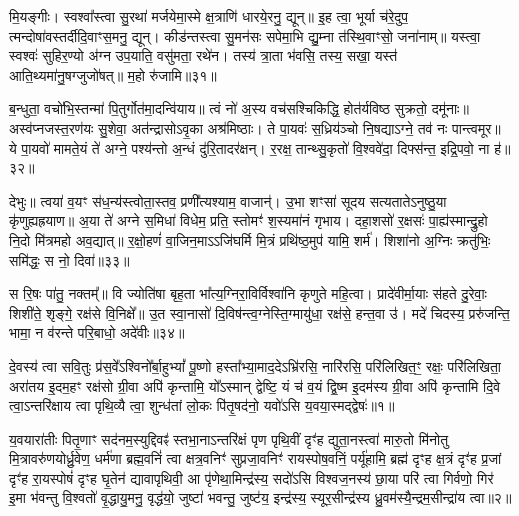 मि॒यङ्गीः। स्वश्वा᳚स्त्वा सु॒रथा॑ मर्जयेमा॒स्मे क्ष॒त्राणि॑ धारये॒रनु॒ द्यून्॥ इ॒ह त्वा॒ भूर्या च॑रे॒दुप॒ त्मन्दोषा॑वस्तर्दीदि॒वाꣳ\-स॒मनु॒ द्यून्। कीड॑न्तस्त्वा सु॒मन॑सः सपेमा॒भि द्यु॒म्ना त॑स्थि॒वाꣳसो॒ जना॑नाम्॥ यस्त्वा॒ स्वश्वः॑ सुहिर॒ण्यो अ॑ग्न उप॒याति॒ वसु॑मता॒ रथे॑न। तस्य॑ त्रा॒ता भ॑वसि॒ तस्य॒ सखा॒ यस्त॑ आति॒थ्यमा॑नु॒षग्जुजो॑षत्॥ म॒हो रु॑जामि॥३१॥

ब॒न्धुता॒ वचो॑भि॒स्तन्मा॑ पि॒तुर्गोत॑मा॒दन्वि॑याय॥ त्वं नो॑ अ॒स्य वच॑सश्चिकिद्धि॒ होत॑र्यविष्ठ सुक्रतो॒ दमू॑नाः॥ अस्व॑प्नजस्त॒रण॑यः सु॒शेवा॒ अत॑न्द्रासो\-ऽवृ॒का अश्र॑मिष्ठाः। ते पा॒यवः॑ स॒ध्रिय॑ञ्चो नि॒षद्या\-ऽग्ने॒ तव॑ नः पान्त्वमूर॥ ये पा॒यवो॑ मामते॒यं ते॑ अग्ने॒ पश्य॑न्तो अ॒न्धं दु॑रि॒तादर॑क्षन्। र॒रक्ष॒ तान्थ्सु॒कृतो॑ वि॒श्ववे॑दा॒ दिफ्स॑न्त॒ इद्रि॒पवो॒ ना ह॑॥३२॥

देभुः॥ त्वया॑ व॒यꣳ स॑ध॒न्य॑स्त्वोता॒स्तव॒ प्रणी᳚त्यश्याम॒ वाजान्॑। उ॒भा शꣳसा॑ सूदय सत्यताते\-ऽनुष्ठु॒या कृ॑णुह्यह्रयाण॥ अ॒या ते॑ अग्ने स॒मिधा॑ विधेम॒ प्रति॒ स्तोमꣳ॑ श॒स्यमा॑नं गृभाय। दहा॒शसो॑ र॒क्षसः॑ पा॒ह्य॑स्मान्द्रु॒हो नि॒दो मि॑त्रमहो अव॒द्यात्॥ र॒क्षो॒हणं॑ वा॒जिन॒मा\-ऽ\-ऽजि॑घर्मि मि॒त्रं प्रथि॑ष्ठ॒मुप॑ यामि॒ शर्म॑। शिशा॑नो अ॒ग्निः क्रतु॑भिः॒ समि॑द्धः॒ स नो॒ दिवा॑॥३३॥

स रि॒षः पा॑तु॒ नक्तम्᳚॥ वि ज्योति॑षा बृह॒ता भा᳚त्य॒ग्निरा॒विर्विश्वा॑नि कृणुते महि॒त्वा। प्रादे॑वीर्मा॒याः स॑हते दु॒रेवाः॒ शिशी॑ते॒ शृङ्गे॒ रक्ष॑से वि॒निक्षे᳚॥ उ॒त स्वा॒नासो॑ दि॒विष॑न्त्व॒ग्नेस्ति॒ग्मायु॑धा॒ रक्ष॑से॒ हन्त॒वा उ॑। मदे॑ चिदस्य॒ प्ररु॑जन्ति॒ भामा॒ न व॑रन्ते परि॒बाधो॒ अदे॑वीः॥३४॥

{}


\setcounter{anuvakam}{0}
दे॒वस्य॑ त्वा सवि॒तुः प्र॑स॒वे᳚\-ऽश्विनो᳚र्बा॒हु\-भ्यां᳚ पू॒ष्णो हस्ता᳚भ्या॒माद॒दे\-ऽभ्रि॑रसि॒ नारि॑रसि॒ परि॑लिखित॒ꣳ॒ रक्षः॒ परि॑लिखिता॒ अरा॑तय इ॒दम॒हꣳ रक्ष॑सो ग्री॒वा अपि॑ कृन्तामि॒ यो᳚\-ऽस्मान् द्वेष्टि॒ यं च॑ व॒यं द्वि॒ष्म इ॒दम॑स्य ग्री॒वा अपि॑ कृन्तामि दि॒वे त्वा॒\-ऽन्तरि॑क्षाय त्वा पृथि॒व्यै त्वा॒ शुन्ध॑तां लो॒कः पि॑तृ॒षद॑नो॒ यवो॑\-ऽसि य॒वया॒स्मद्द्वेषः॑॥१॥

य॒वयारा॑तीः पितृ॒णाꣳ सद॑नम॒स्युद्दिवꣴ॑ स्तभा॒ना\-ऽन्तरि॑क्षं पृण पृथि॒वीं दृꣳ॑ह द्युता॒नस्त्वा॑ मारु॒तो मि॑नोतु मि॒त्रावरु॑णयोर्ध्रु॒वेण॒ धर्म॑णा ब्रह्म॒वनिं॑ त्वा क्षत्र॒वनिꣳ॑ सुप्रजा॒वनिꣳ॑ रायस्पोष॒वनिं॒ पर्यू॑हामि॒ ब्रह्म॑ दृꣳह क्ष॒त्रं दृꣳ॑ह प्र॒जां दृꣳ॑ह रा॒यस्पोषं॑ दृꣳह घृ॒तेन॑ द्यावापृथिवी॒ आ पृ॑णेथा॒मिन्द्र॑स्य॒ सदो॑\-ऽसि विश्वज॒नस्य॑ छा॒या परि॑ त्वा गिर्वणो॒ गिर॑ इ॒मा भ॑वन्तु वि॒श्वतो॑ वृ॒द्धायु॒मनु॒ वृद्ध॑यो॒ जुष्टा॑ भवन्तु॒ जुष्ट॑य॒ इन्द्र॑स्य॒ स्यूर॒सीन्द्र॑स्य ध्रु॒वम॑स्यै॒न्द्रम॒सीन्द्रा॑य त्वा॥२॥


